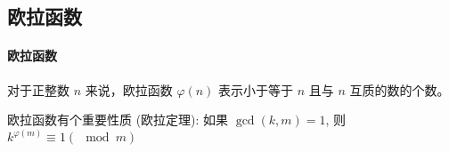 \subsection{欧拉函数}
	\paragraph{欧拉函数} 对于正整数 $n$ 来说，欧拉函数 $\varphi (n)$ 表示小于等于 $n$ 且与 $n$ 互质的数的个数。
	
	欧拉函数有个重要性质 (欧拉定理): 如果 $\gcd(k,m)=1$, 则 $k^{{\varphi (m)}}\equiv 1(\mod m)$
	
	
	
	